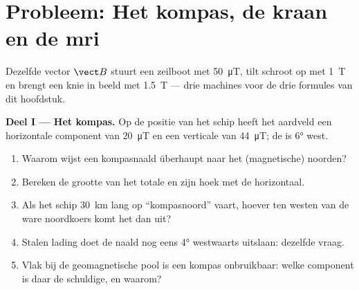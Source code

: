\section{Probleem: Het kompas, de kraan en de mri}

\begin{problem}
\label{pb:g11:magnetic-fields:1}
Dezelfde vector $\vect B$ stuurt een zeilboot met \qty{50}{\micro T},
tilt schroot op met \qty{1}{T} en brengt een knie in beeld met
\qty{1.5}{T} --- drie machines voor de drie formules van dit hoofdstuk.

\medskip
\noindent\textbf{Deel I --- Het kompas.}
Op de positie van het schip heeft het aardveld een horizontale component
van \qty{20}{\micro T} en een verticale van \qty{44}{\micro T}; de
 is $\ang{6}$ west.
\begin{enumerate}
  \item Waarom wijst een kompasnaald überhaupt naar het (magnetische)
        noorden?
  \item Bereken de grootte van het totale  en zijn hoek met de
        horizontaal.
  \item Als het schip \qty{30}{km} lang op ``kompasnoord'' vaart, hoever
        ten westen van de ware noordkoers komt het dan uit?
  \item Stalen lading doet de naald nog eens $\ang{4}$ westwaarts
        uitslaan: dezelfde vraag.
  \item Vlak bij de geomagnetische pool is een kompas onbruikbaar: welke
        component is daar de schuldige, en waarom?
\end{enumerate}


\end{problem}
